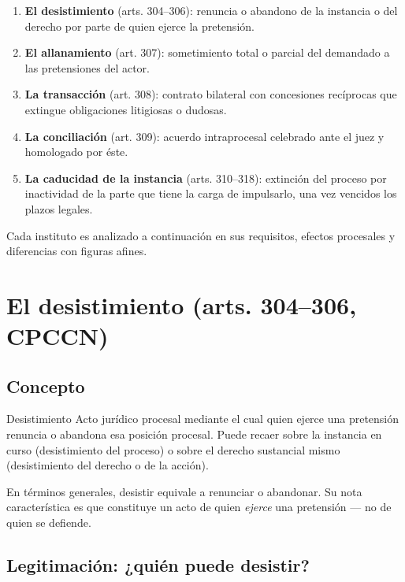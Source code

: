 \documentclass[12pt,oneside]{book}
\begin{document}
\begin{enumerate}
    \item \textbf{El desistimiento} (arts. 304--306): renuncia o abandono de la instancia o del derecho por parte de quien ejerce la pretensión.
    \item \textbf{El allanamiento} (art. 307): sometimiento total o parcial del demandado a las pretensiones del actor.
    \item \textbf{La transacción} (art. 308): contrato bilateral con concesiones recíprocas que extingue obligaciones litigiosas o dudosas.
    \item \textbf{La conciliación} (art. 309): acuerdo intraprocesal celebrado ante el juez y homologado por éste.
    \item \textbf{La caducidad de la instancia} (arts. 310--318): extinción del proceso por inactividad de la parte que tiene la carga de impulsarlo, una vez vencidos los plazos legales.
\end{enumerate}

Cada instituto es analizado a continuación en sus requisitos, efectos procesales y diferencias con figuras afines.

\chapter{El desistimiento (arts. 304--306, CPCCN)}

\section{Concepto}

\begin{definition}{Desistimiento}
Acto jurídico procesal mediante el cual quien ejerce una pretensión renuncia o abandona esa posición procesal. Puede recaer sobre la instancia en curso (desistimiento del proceso) o sobre el derecho sustancial mismo (desistimiento del derecho o de la acción).
\end{definition}

En términos generales, desistir equivale a renunciar o abandonar. Su nota característica es que constituye un acto de quien \emph{ejerce} una pretensión --- no de quien se defiende.

\section{Legitimación: ¿quién puede desistir?}
\end{document}
